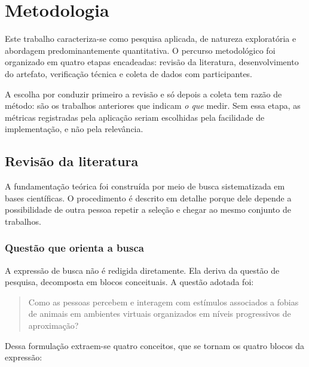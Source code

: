 \section{Metodologia}
\label{sec:metodologia}


Este trabalho caracteriza-se como pesquisa aplicada, de natureza
exploratória e abordagem predominantemente quantitativa. O percurso
metodológico foi organizado em quatro etapas encadeadas: revisão da
literatura, desenvolvimento do artefato, verificação técnica e coleta de
dados com participantes.

A escolha por conduzir primeiro a revisão e só depois a coleta tem razão
de método: são os trabalhos anteriores que indicam \emph{o que} medir.
Sem essa etapa, as métricas registradas pela aplicação seriam escolhidas
pela facilidade de implementação, e não pela relevância.

\subsection{Revisão da literatura}
\label{sec:revisao}

A fundamentação teórica foi construída por meio de busca sistematizada em
bases científicas. O procedimento é descrito em detalhe porque dele
depende a possibilidade de outra pessoa repetir a seleção e chegar ao
mesmo conjunto de trabalhos.

\subsubsection{Questão que orienta a busca}

A expressão de busca não é redigida diretamente. Ela deriva da questão de
pesquisa, decomposta em blocos conceituais. A questão adotada foi:

\begin{quote}
Como as pessoas percebem e interagem com estímulos associados a fobias de
animais em ambientes virtuais organizados em níveis progressivos de
aproximação?
\end{quote}

Dessa formulação extraem-se quatro conceitos, que se tornam os quatro
blocos da expressão:

